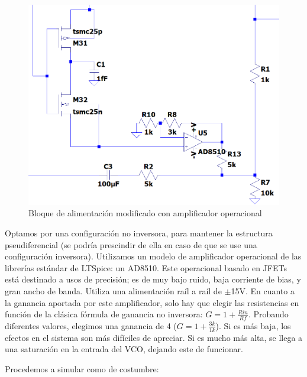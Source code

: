 \documentclass[12pt]{report} %
\begin{document}
	\begin{figure}[H]
		\includegraphics[width=\textwidth]{vco-closed-opamp-block.png}
		\caption[Bloque de alimentación modificado con amplificador operacional]{Bloque de alimentación modificado con amplificador operacional}
		\label{fig:vco-closed-opamp-block.png}
	\end{figure}

	Optamos por una configuración no inversora, para mantener la estructura pseudiferencial (se podría prescindir de ella en caso de que se use una configuración inversora). Utilizamos un modelo de amplificador operacional de las librerías estándar de LTSpice: un AD8510. Este operacional basado en JFETs está destinado a usos de precisión; es de muy bajo ruido, baja corriente de bias, y gran ancho de banda. Utiliza una alimentación raíl a raíl de $\pm$15V. En cuanto a la ganancia aportada por este amplificador, solo hay que elegir las resistencias en función de la clásica fórmula de ganancia no inversora: $G = 1 + \frac{Rin}{Rf}$. Probando diferentes valores, elegimos una ganancia de 4 ($G = 1 + \frac{3k}{1k}$). Si es más baja, los efectos en el sistema son más difíciles de apreciar. Si es mucho más alta, se llega a una saturación en la entrada del VCO, dejando este de funcionar.
	
	Procedemos a simular como de costumbre:
\end{document}
